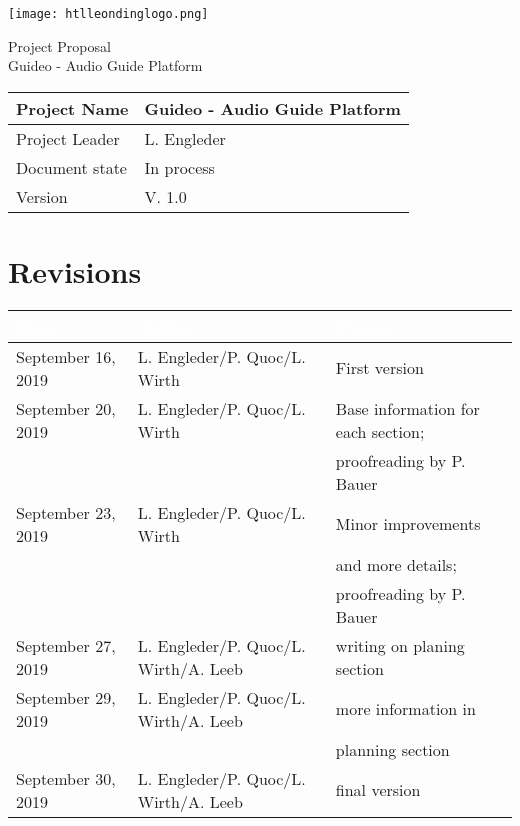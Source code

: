 \documentclass[12pt]{article}
\theoremstyle{definition}
\newcommand{\productname}{Guideo - Audio Guide Platform}
\newcommand{\projectleader}{L. Engleder}
\newcommand{\documentstatus}{In process}
\newcommand{\version}{V. 1.0}
\begin{document}
\begin{titlepage}
\begin{flushright}
\texttt{[image: htlleondinglogo.png]}\\
\end{flushright}
 
\vspace{10em}
 
\begin{center}
{\Huge Project Proposal} \\[3em]
{\LARGE \productname} \\[3em]
\end{center}
 
\begin{flushleft}
\begin{tabular}{|l|l|}
\hline
Project Name & \productname \\ \hline
Project Leader & \projectleader \\ \hline
Document state & \documentstatus \\ \hline
Version & \version \\ \hline
\end{tabular}
\end{flushleft}
 
\end{titlepage}
\section*{Revisions}
\begin{tabular}{|l|l|l|}
\hline
\cellcolor[gray]{0.5}\textcolor{white}{Date} & \cellcolor[gray]{0.5}\textcolor{white}{Author} & \cellcolor[gray]{0.5}\textcolor{white}{Change} \\ \hline
September 16, 2019&L. Engleder/P. Quoc/L. Wirth&First version \\ \hline
September 20, 2019&L. Engleder/P. Quoc/L. Wirth& Base information for each section; \\ && proofreading by P. Bauer \\ \hline
September 23, 2019&L. Engleder/P. Quoc/L. Wirth&Minor improvements \\ && and more details;  \\ && proofreading by P. Bauer \\ \hline
September 27, 2019&L. Engleder/P. Quoc/L. Wirth/A. Leeb&writing on planing section \\ \hline
September 29, 2019&L. Engleder/P. Quoc/L. Wirth/A. Leeb&more information in \\ && planning section \\ \hline
September 30, 2019&L. Engleder/P. Quoc/L. Wirth/A. Leeb&final version\\ \hline
\end{tabular}
\pagebreak
 
\end{document}
